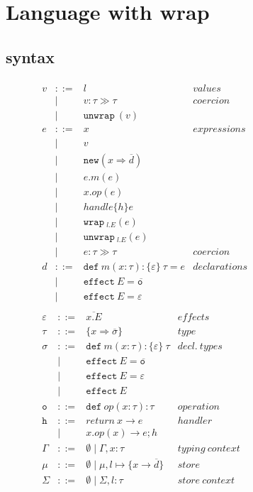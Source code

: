 \documentclass{article}
\theoremstyle{definition}
\newcommand{\keywadj}[1]{\mathtt{#1}}
\newcommand{\keyw}[1]{\keywadj{#1}~}
\begin{document}
\pagebreak
\section{Language with wrap}
\subsection{syntax}
\begin{figure}[H]
\small{
\[
\begin{array}{lll}
\begin{array}{lllr}
v & ::= & l & \mathit{values}\\
& | & v : \tau \gg \tau  & \mathit{coercion}\\
& | & \keyw{unwrap}(v) \\
e & ::= & x & \mathit{expressions}\\
& | & v \\
& | & \keywadj{new}(x \Rightarrow \overline{d}) \\
& | & e.m(e)\\
& | & x.op(e)\\
& | & handle \{ h \} e\\
& | & \keyw{wrap}_{l.E}(e) \\
& | & \keyw{unwrap}_{l.E}(e)\\
& | & e : \tau \gg \tau & \mathit{ coercion}\\
d & ::= & \keyw{def} m(x : \tau) :  \{\varepsilon\} ~\tau = e &
\mathit{declarations}\\
& |   & \keyw{effect} E = \overline{\keyw{o}} \\
& |   & \keyw{effect} E = \varepsilon \\


\end{array}
\begin{array}{lllr}


\varepsilon & ::= & \overline{x.E} & \mathit{effects}\\
\tau & ::= & \{ x \Rightarrow \overline{\sigma} \} & \mathit{type}\\
\sigma & ::= & \keyw{def} m(x : \tau) : \{\varepsilon\} ~\tau & \mathit{decl.~types}\\
       & |   & \keyw{effect} E = \overline{\keyw{o}}\\
       & |   & \keyw{effect} E = \varepsilon\\
       & |   & \keyw{effect} E \\
\keyw{o} & ::= & \keyw{def} op(x:\tau):  \tau & \mathit{operation}\\
\keyw{h} & ::= & return\ x \rightarrow e & \mathit{handler}\\
& | & x.op(x) \rightarrow e; h \\
\Gamma & ::= & \emptyset \mid \Gamma, x:\tau & \mathit{typing\ context}\\
\mu & ::= & \emptyset \mid \mu, l \mapsto \{x \rightarrow \overline{d}\} & \mathit{store}\\
\Sigma & ::= & \emptyset \mid \Sigma, l : \tau & \mathit{store\ context}\\



\end{array}
\end{array}\]}
\end{figure}
\end{document}
